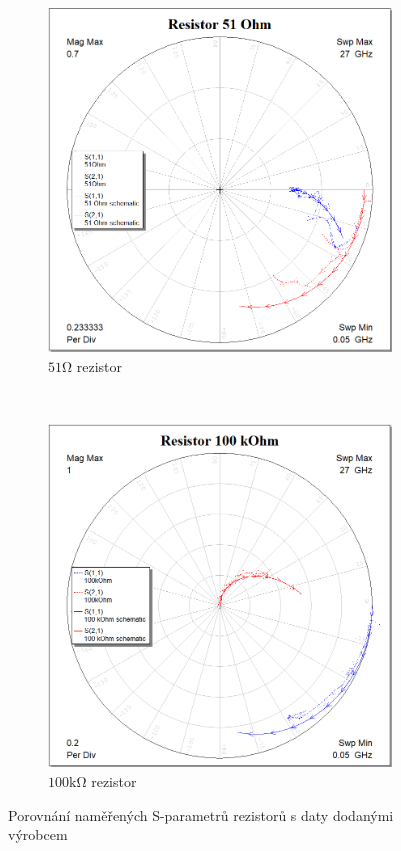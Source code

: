 \documentclass[11pt,a4paper]{article}
\newcommand{\Ohm}{\mathrm{\Omega}}
\newcommand{\kOhm}{\mathrm{k\Omega}}
\begin{document}
\begin{figure}[!ht]
\begin{subfigure}{0.45\textwidth}
    \includegraphics[width=\textwidth]{src/resistor-51Ohm.png}
    \caption{\label{fig:resistor-51Ohm}$51\Ohm$ rezistor}
\end{subfigure}\\[3mm]
\begin{subfigure}{0.45\textwidth}
    \centering
    \includegraphics[width=\textwidth]{src/resistor-100kOhm.png}
    \caption{\label{fig:resistor-100kOhm}$100\kOhm$ rezistor}
\end{subfigure}
\caption{\label{fig:resistors}Porovnání naměřených S-parametrů rezistorů s daty dodanými výrobcem}
\end{figure}
\end{document}
